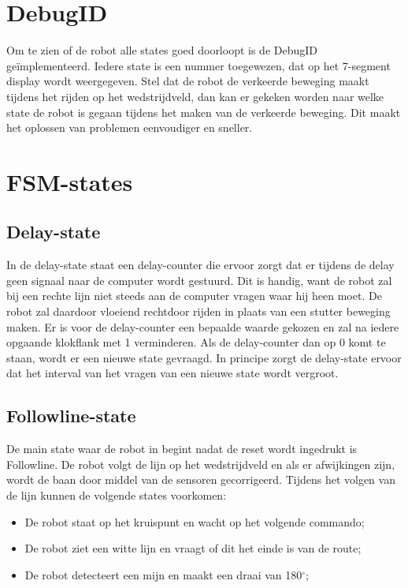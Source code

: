 \documentclass{report}
\begin{document}
\section{DebugID}
Om te zien of de robot alle states goed doorloopt is de DebugID ge\"{i}mplementeerd.
Iedere state is een nummer toegewezen, dat op het 7-segment display wordt weergegeven.
Stel dat de robot de verkeerde beweging maakt tijdens het rijden op het wedstrijdveld, dan kan er gekeken worden naar welke state de robot is gegaan tijdens het maken van de verkeerde beweging.
Dit maakt het oplossen van problemen eenvoudiger en sneller.


\section{FSM-states}

\subsection{Delay-state}
In de delay-state staat een delay-counter die ervoor zorgt dat er tijdens de delay geen signaal naar de computer wordt gestuurd.
Dit is handig, want de robot zal bij een rechte lijn niet steeds aan de computer vragen waar hij heen moet.
De robot zal daardoor vloeiend rechtdoor rijden in plaats van een stutter beweging maken.
Er is voor de delay-counter een bepaalde waarde gekozen en zal na iedere opgaande klokflank met 1 verminderen.
Als de delay-counter dan op 0 komt te staan, wordt er een nieuwe state gevraagd.
In principe zorgt de delay-state ervoor dat het interval van het vragen van een nieuwe state wordt vergroot.


\subsection{Followline-state}
De main state waar de robot in begint nadat de reset wordt ingedrukt is Followline.
De robot volgt de lijn op het wedstrijdveld en als er afwijkingen zijn, wordt de baan door middel van de sensoren gecorrigeerd.
Tijdens het volgen van de lijn kunnen de volgende states voorkomen: 
\begin{itemize}
\item De robot staat op het kruispunt en wacht op het volgende commando;
\item De robot ziet een witte lijn en vraagt of dit het einde is van de route;
\item De robot detecteert een mijn en maakt een draai van 180$^\circ$;
\end{itemize}
\end{document}
